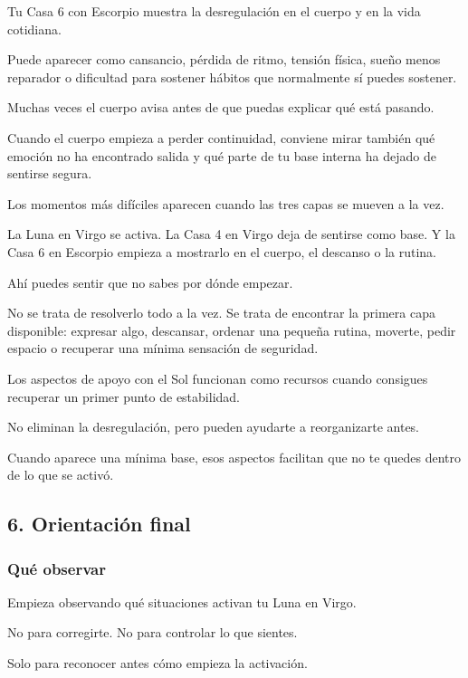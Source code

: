 \documentclass[11pt,a4paper]{article}
\begin{document}
Tu Casa 6 con Escorpio muestra la desregulación en el cuerpo y en la vida cotidiana.

Puede aparecer como cansancio, pérdida de ritmo, tensión física, sueño menos reparador o dificultad para sostener hábitos que normalmente sí puedes sostener.

Muchas veces el cuerpo avisa antes de que puedas explicar qué está pasando.

Cuando el cuerpo empieza a perder continuidad, conviene mirar también qué emoción no ha encontrado salida y qué parte de tu base interna ha dejado de sentirse segura.

Los momentos más difíciles aparecen cuando las tres capas se mueven a la vez.

La Luna en Virgo se activa.
La Casa 4 en Virgo deja de sentirse como base.
Y la Casa 6 en Escorpio empieza a mostrarlo en el cuerpo, el descanso o la rutina.

Ahí puedes sentir que no sabes por dónde empezar.

No se trata de resolverlo todo a la vez.
Se trata de encontrar la primera capa disponible: expresar algo, descansar, ordenar una pequeña rutina, moverte, pedir espacio o recuperar una mínima sensación de seguridad.

Los aspectos de apoyo con el Sol funcionan como recursos cuando consigues recuperar un primer punto de estabilidad.

No eliminan la desregulación, pero pueden ayudarte a reorganizarte antes.

Cuando aparece una mínima base, esos aspectos facilitan que no te quedes dentro de lo que se activó.

\vspace{0.8cm}

\subsection{6. Orientación final}

\subsubsection*{Qué observar}

Empieza observando qué situaciones activan tu Luna en Virgo.

No para corregirte.
No para controlar lo que sientes.

Solo para reconocer antes cómo empieza la activación.
\end{document}
